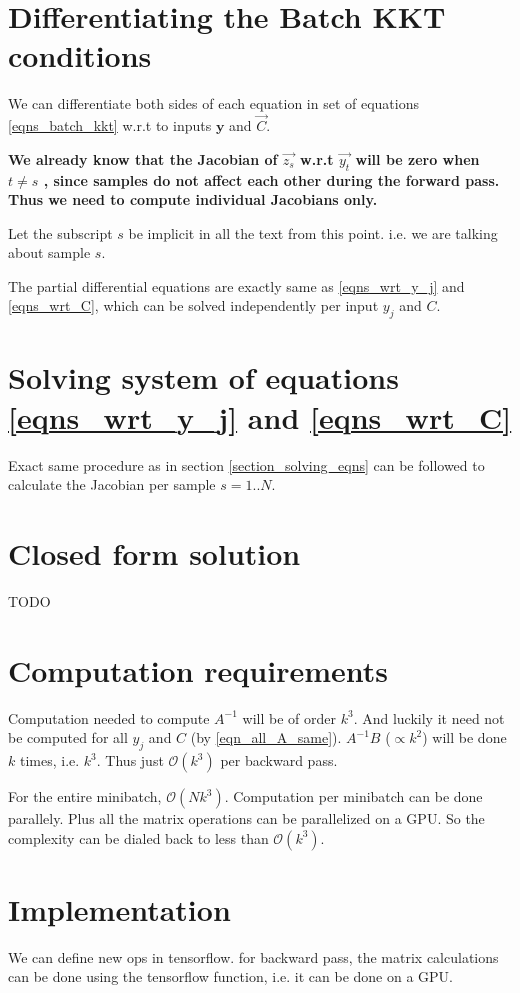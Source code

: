 \documentclass[11 pt]{article}
\begin{document}
\section{Differentiating the Batch KKT conditions}

We can differentiate both sides of each equation in set of equations \ref{eqns_batch_kkt} w.r.t to inputs $\bm{y}$ and $\vec{C}$.

\textbf{We already know that the Jacobian of $\vec{z_s}$ w.r.t $\vec{y_t}$ will be zero when $t \ne s$ , since samples do not affect each other during the forward pass. Thus we need to compute individual Jacobians only.}

Let the subscript $s$ be implicit in all the text from this point. i.e. we are talking about sample $s$.

The partial differential equations are exactly same as \ref{eqns_wrt_y_j} and \ref{eqns_wrt_C}, which can be solved independently per input $y_j$ and $C$.

\section{Solving system of equations \ref{eqns_wrt_y_j} and \ref{eqns_wrt_C}}

Exact same procedure as in section \ref{section_solving_eqns} can be followed to calculate the Jacobian per sample $s=1..N$.


\section{Closed form solution}
TODO


\section{Computation requirements}

Computation needed to compute $A^{-1}$ will be of order $k^3$. And luckily it need not be computed for all $y_j$ and $C$ (by \ref{eqn_all_A_same}). $A^{-1}B$ ($\propto k^2$) will be done $k$ times, i.e. $k^3$.
Thus just $\mathcal{O}(k^3)$ per backward pass.

For the entire minibatch, $\mathcal{O}(N k^3)$. Computation per minibatch can be done parallely. Plus all the matrix operations can be parallelized on a GPU. So the complexity can be dialed back to less than $\mathcal{O}(k^3)$.


\section{Implementation}

We can define new ops in tensorflow. for backward pass, the matrix calculations can be done using the tensorflow function, i.e. it can be done on a GPU.
\end{document}
